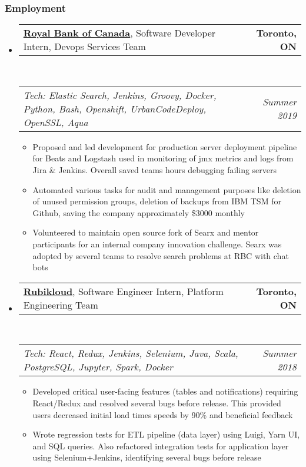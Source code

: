 \documentclass[10pt,letterpaper]{article}
\makeatletter
\newcommand{\headerrow}[2]
{\begin{tabular*}{\linewidth}{l@{\extracolsep{\fill}}r}
		#1 &
		#2 \\
\end{tabular*}}
\makeatother
\begin{document}
	
	\subsubsection*{Employment}
	
	\begin{itemize}[label={}, leftmargin=*]



		\item
		\headerrow
		{\textbf{\href{https://www.rbc.com/about-rbc.html}{Royal Bank of Canada}}, Software Developer Intern, Devops Services Team}
		{\textbf{Toronto, ON}}
		\\
		\headerrow
		{\emph{Tech: Elastic Search, Jenkins, Groovy, Docker, Python, Bash, Openshift, UrbanCodeDeploy, OpenSSL, Aqua}}
		{\emph{Summer 2019}}
		\begin{itemize}
			\setlength\itemsep{0.1em}
			\item  Proposed and led development for production server deployment pipeline for Beats and Logstash used in monitoring of jmx metrics and logs from Jira \& Jenkins. Overall saved teams hours debugging failing servers
		
			\item Automated various tasks for audit and management purposes like deletion of unused permission groups, deletion of backups from IBM TSM  for Github, saving the company approximately \$3000 monthly
			
			\item  Volunteered to maintain open source fork of Searx and mentor participants for an internal company innovation challenge. Searx was adopted by several teams to resolve search problems at RBC with chat bots
			\end{itemize}


		\item
		\headerrow
		{\textbf{\href{https://rubikloud.com/}{Rubikloud}}, Software Engineer Intern, Platform Engineering Team}
		{\textbf{Toronto, ON}}
		\\
		\headerrow
		{\emph{Tech: React, Redux, Jenkins, Selenium, Java, Scala, PostgreSQL, Jupyter, Spark, Docker}}
		{\emph{Summer 2018}}
		\begin{itemize}
			\setlength\itemsep{0.1em}
			\item Developed critical user-facing features (tables and notifications)  requiring React/Redux and resolved several bugs before release. This provided users decreased initial load times speeds by 90\% and beneficial feedback
			\item Wrote regression tests for ETL pipeline (data layer) using Luigi, Yarn UI, and SQL queries. Also refactored integration tests for application layer using Selenium+Jenkins, identifying  several bugs before release
			
			

		\end{itemize}

		
	\end{itemize}
\end{document}
